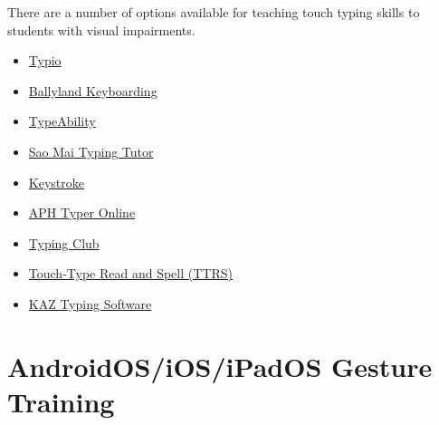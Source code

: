There are a number of options available for teaching touch typing skills to students with visual impairments.
\begin{itemize}
 \item \href{https://www.accessibyte.com/typio-online-page/}{Typio}\cite{Typio2025}
 \item \href{https://www.sonokids.org/ballyland-early-learning/ballyland-keyboarding/}{Ballyland Keyboarding}\cite{Ballyland2025}
 \item \href{https://nelowvision.com/product/typeability-typing-and-computer-tutor-program-for-the-blind-and-visually-impaired/}{TypeAbility}\cite{TypeAbility2025}
 \item \href{https://saomaicenter.org/en/smsoft/smtt}{Sao Mai Typing Tutor}\cite{SaoMai2025}
 \item \href{https://www.cfb.state.nm.us/apps/}{Keystroke}\cite{Keystroke2025}
 \item \href{https://typer.aphtech.org/}{APH Typer Online}\cite{APH2025}
 \item \href{https://www.typingclub.com/}{Typing Club}\cite{TypingClub2025}
 \item \href{https://www.readandspell.com/us/typing-for-the-blind}{Touch-Type Read and Spell (TTRS)}\cite{TTRS2025}
 \item \href{https://kaz-type.com/visualimpairment}{KAZ Typing Software}\cite{KAZ2025}
\end{itemize}



\section{AndroidOS/iOS/iPadOS Gesture Training}\label{appx6}

